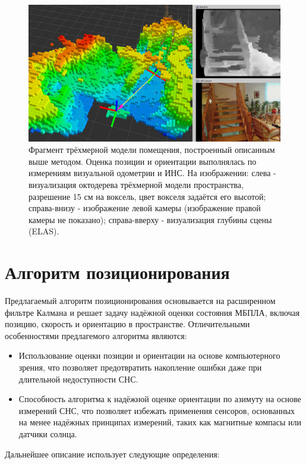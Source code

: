 \documentclass[11pt,a4paper]{article}
\begin{document}
\begin{figure}[!htbp]
    \includegraphics[width=1\textwidth]{octomap.png}
    \caption{\label{fig:octomap}Фрагмент трёхмерной модели помещения, построенный описанным выше методом. Оценка позиции и ориентации выполнялась по измерениям визуальной одометрии и ИНС. На изображении: слева - визуализация октодерева трёхмерной модели пространства, разрешение 15 см на воксель, цвет вокселя задаётся его высотой; справа-внизу - изображение левой камеры (изображение правой камеры не показано); справа-вверху - визуализация глубины сцены (ELAS).}
\end{figure}

\section{Алгоритм позиционирования}

Предлагаемый алгоритм позиционирования основывается на расширенном фильтре Калмана и решает задачу надёжной оценки состояния МБПЛА, включая позицию, скорость и ориентацию в пространстве. Отличительными особенностями предлагемого алгоритма являются:

\begin{itemize}
    \item Использование оценки позиции и ориентации на основе компьютерного зрения, что позволяет предотвратить накопление ошибки даже при длительной недоступности СНС.
    \item Способность алгоритма к надёжной оценке ориентации по азимуту на основе измерений СНС, что позволяет избежать применения сенсоров, основанных на менее надёжных принципах измерений, таких как магнитные компасы или датчики солнца.
\end{itemize}

Дальнейшее описание использует следующие определения:
\end{document}
